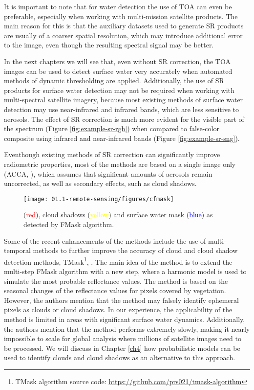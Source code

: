 It is important to note that for water detection the use of TOA can even be preferable, especially when working with multi-mission satellite products. The main reason for this is that the auxiliary datasets used to generate SR products are usually of a coarser spatial resolution, which may introduce additional error to the image, even though the resulting spectral signal may be better. 

In the next chapters we will see that, even without SR correction, the TOA images can be used to detect surface water very accurately when automated methods of dynamic thresholding are applied. Additionally, the use of SR products for surface water detection may not be required when working with multi-spectral satellite imagery, because most existing methods of surface water detection may use near-infrared and infrared bands, which are less sensitive to aerosols. The effect of SR correction is much more evident for the visible part of the spectrum (Figure \ref{fig:example-sr-rgb}) when compared to false-color composite using infrared and near-infrared bands (Figure \ref{fig:example-sr-sng}).

Eventhough existing methods of SR correction can significantly improve radiometric properties, most of the methods are based on a single image only (ACCA, \citet{irish2006characterization}), which assumes that significant amounts of aerosols remain uncorrected, as well as secondary effects, such as cloud shadows.

\begin{figure}[H]
	\texttt{[image: 01.1-remote-sensing/figures/cfmask]}
	\caption{(\textcolor{red}{red}), cloud shadows (\textcolor{yellow}{yellow}) and surface water mask (\textcolor{blue}{blue}) as detected by FMask algorithm. }
	\label{fig:cfmask}
\end{figure}

Some of the recent enhancements of the methods include the use of multi-temporal methods to further improve the accuracy of cloud and cloud shadow detection methods, TMask\footnote{TMask algorithm source code: \url{https://github.com/prs021/tmask-algorithm}}, \citet{Zhu2014}. The main idea of the method is to extend the multi-step FMask algorithm with a new step, where a harmonic model is used to simulate the most probable reflectance values. The method is based on the seasonal changes of the reflectance values for pixels covered by vegetation. However, the authors mention that the method may falsely identify ephemeral pixels as clouds or cloud shadows. In our experience, the applicability of the method is limited in areas with significant surface water dynamics. Additionally, the authors mention that the method performs extremely slowly, making it nearly impossible to scale for global analysis where millions of satellite images need to be processed. We will discuss in Chapter \ref{ch4} how probabilistic models can be used to identify clouds and cloud shadows as an alternative to this approach. 

